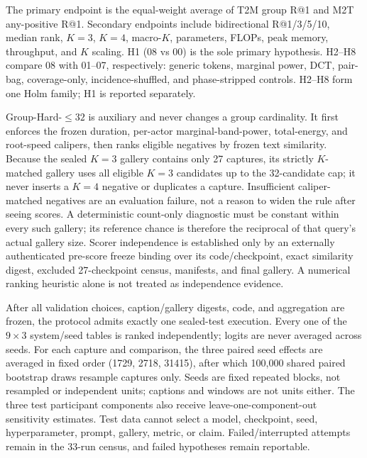 \documentclass{article}
\begin{document}
\balance

The primary endpoint is the equal-weight average of T2M group R@1 and M2T
any-positive R@1. Secondary endpoints include bidirectional R@1/3/5/10,
median rank, $K{=}3$, $K{=}4$, macro-$K$, parameters, FLOPs, peak memory,
throughput, and $K$ scaling. H1 (08 vs 00) is the sole primary hypothesis. H2--H8 compare 08 with
01--07, respectively: generic tokens, marginal power, DCT, pair-bag,
coverage-only, incidence-shuffled, and phase-stripped controls. H2--H8 form one
Holm family; H1 is reported separately.

Group-Hard-$\leq32$ is auxiliary and never changes a group cardinality. It
first enforces the frozen duration, per-actor marginal-band-power, total-energy,
and root-speed calipers, then ranks eligible negatives by frozen text
similarity. Because the sealed $K{=}3$ gallery contains only 27 captures, its
strictly $K$-matched gallery uses all eligible $K{=}3$ candidates up to the
32-candidate cap; it never inserts a $K{=}4$ negative or duplicates a capture.
Insufficient caliper-matched negatives are an evaluation failure, not a reason
to widen the rule after seeing scores. A deterministic count-only diagnostic
must be constant within every such gallery; its reference chance is therefore
the reciprocal of that query's actual gallery size.
Scorer independence is established only by an externally authenticated
pre-score freeze binding over its code/checkpoint, exact similarity digest,
excluded 27-checkpoint census, manifests, and final gallery. A numerical
ranking heuristic alone is not treated as independence evidence.

After all validation choices, caption/gallery digests, code, and aggregation
are frozen, the protocol admits exactly one sealed-test execution. Every one
of the $9\times3$ system/seed tables is ranked independently; logits are never
averaged across seeds. For each capture and comparison, the three paired seed
effects are averaged in fixed order (1729, 2718, 31415), after which 100,000
shared paired bootstrap draws resample captures only. Seeds are fixed repeated
blocks, not resampled or independent units; captions and windows are not units
either. The three test
participant components also receive leave-one-component-out sensitivity
estimates. Test data cannot select a model, checkpoint, seed, hyperparameter,
prompt, gallery, metric, or claim. Failed/interrupted attempts remain in the
33-run census, and failed hypotheses remain reportable.
\end{document}
